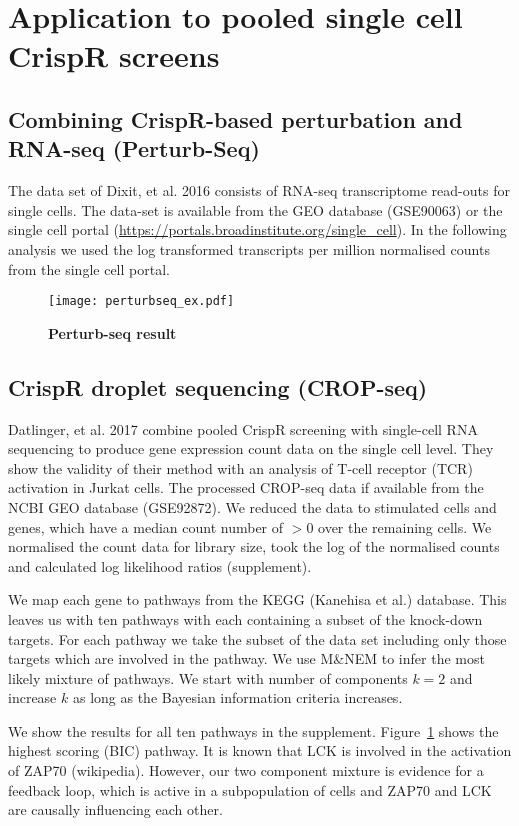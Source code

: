 \documentclass[12pt]{article}
\begin{document}
\section{Application to pooled single cell CrispR screens}

\subsection{Combining CrispR-based perturbation and RNA-seq (Perturb-Seq)}

The data set of Dixit, et al. 2016 consists of RNA-seq transcriptome read-outs for single cells. The data-set is available from the GEO database (GSE90063) or the single cell portal (\url{https://portals.broadinstitute.org/single_cell}). In the following analysis we used the log transformed transcripts per million normalised counts from the single cell portal. 

\begin{figure}
\texttt{[image: perturbseq\_ex.pdf]}
\caption{\textbf{Perturb-seq result}}\label{fig:cropseq}
\end{figure}

\subsection{CrispR droplet sequencing (CROP-seq)}

Datlinger, et al. 2017 combine pooled CrispR screening with single-cell RNA sequencing to produce gene expression count data on the single cell level. They show the validity of their method with an analysis of T-cell receptor (TCR) activation in Jurkat cells. The processed CROP-seq data if available from the NCBI GEO database (GSE92872). We reduced the data to stimulated cells and genes, which have a median count number of $> 0$ over the remaining cells. We normalised the count data for library size, took the log of the normalised counts and calculated log likelihood ratios (supplement).

We map each gene to pathways from the KEGG (Kanehisa et al.) database. This leaves us with ten pathways with each containing a subset of the knock-down targets. For each pathway we take the subset of the data set including only those targets which are involved in the pathway. We use M\&NEM to infer the most likely mixture of pathways. We start with number of components $k=2$ and increase $k$ as long as the Bayesian information criteria increases. 

We show the results for all ten pathways in the supplement. Figure~\ref{fig:cropseq} shows the highest scoring (BIC) pathway. It is known that LCK is involved in the activation of ZAP70 (wikipedia). However, our two component mixture is evidence for a feedback loop, which is active in a subpopulation of cells and ZAP70 and LCK are causally influencing each other.
\end{document}
